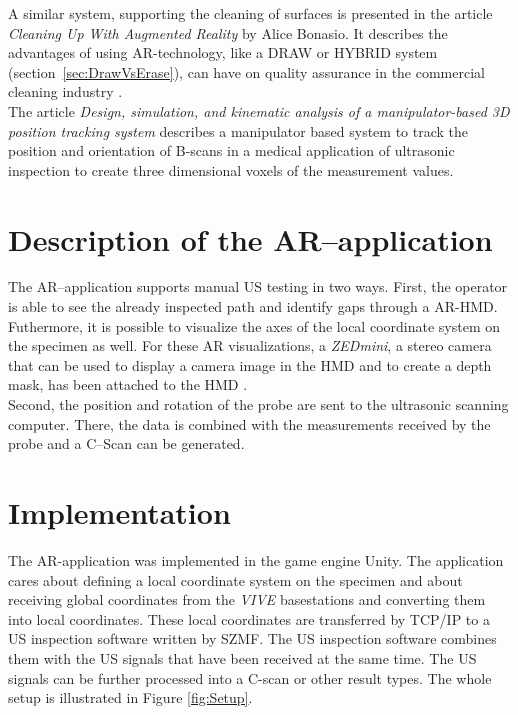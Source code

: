\documentclass{VRARWorkshop}
\begin{document}
A similar system, supporting the cleaning of surfaces is presented in the article \textit{Cleaning Up With Augmented Reality} by Alice Bonasio.
It describes the advantages of using AR-technology, like a DRAW or HYBRID system (section~\ref{sec:DrawVsErase}), can have on quality assurance in the commercial cleaning industry \cite{ARClean}.\\

The article \textit{Design, simulation, and kinematic analysis of a manipulator-based 3D position tracking system} describes a manipulator based system to track the position and orientation of B-scans in a medical application of ultrasonic inspection to create three dimensional voxels of the measurement values.
\cite{fadzil_design_2015}\\


\section{Description of the AR--application}
The AR--application supports manual US testing in two ways. First,
the operator is able to see the already inspected path and identify gaps through a AR-{\sc HMD}.
Futhermore, it is possible to visualize the axes of the local coordinate system on the specimen as well.
For these AR visualizations, a \textit{ZEDmini}, a stereo camera that can be used to display a camera image in the {\sc HMD} and to create a depth mask, has been attached to the {\sc HMD} \cite{dorner_virtual_2013}. \\
Second, the position and rotation of the probe are sent to the ultrasonic scanning computer.
There, the data is combined with the measurements received by the probe and a C--Scan can be
generated.

\section{Implementation}
The AR-application was implemented in the game engine Unity. The application cares about defining a local coordinate system on the specimen and about receiving global coordinates from the \textit{VIVE} basestations and converting them into local coordinates.
These local coordinates are transferred by TCP/IP to a US inspection software written by SZMF.
The US inspection software combines them with the US signals that have been received
at the same time. The US signals can be further processed into a C-scan or other result types.
The whole setup is illustrated in Figure \ref{fig:Setup}. \\
\end{document}
